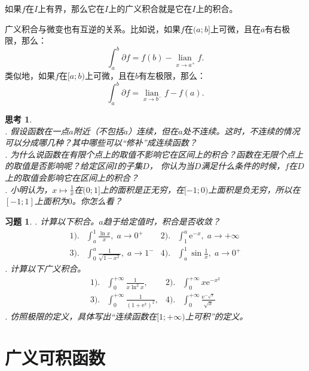 \documentclass[12pt,UTF8]{ctexbook}
\newcommand{\lian}[1]{
    \underset{#1}{\operatorname{lian}\,}
}
\newcommand{\e}{\mathrm{e}}
\theoremstyle{definition}
\theoremstyle{plain}
\newtheorem{sk}{思考}[section]
\newtheorem{xt}{习题}[section]
\begin{document}
如果$f$在$I$上有界，那么它在$I$上的广义积合就是它在$I$上的积合。

广义积合与微变也有互逆的关系。比如说，如果$f$在$(a;b]$上可微，且在$a$有右极限，那么：
$$ \int_a^b \partial f = f(b) - \lian{x\to a^+} f.$$
类似地，如果$f$在$[a;b)$上可微，且在$b$有左极限，那么：
$$ \int_a^b \partial f = \lian{x\to b^-} f - f(a).$$

\begin{sk}
    \mbox{} \\
    . 假设函数在一点$a$附近（不包括$a$）连续，但在$a$处不连续。这时，不连续的情况可以分成哪几种？其中哪些可以“修补”成连续函数？\\
    . 为什么说函数在有限个点上的取值不影响它在区间上的积合？函数在无限个点上的取值是否影响呢？给定区间$I$的子集$D$，
    你认为当$D$满足什么条件的时候，$f$在$D$上的取值会影响它在区间上的积合？\\
    . 小明认为，$x\mapsto\frac{1}{x}$在$(0;1]$上的面积是正无穷，在$[-1;0)$上面积是负无穷，所以在$[-1;1]$上面积为$0$。你怎么看？
\end{sk}

\begin{xt}
    . 计算以下积合。$a$趋于给定值时，积合是否收敛？\\    
    \begin{align*}
        1).& \int_a^{1} \frac{\ln{x}}{x} , \; a\to 0^+  &2).& \int_1^{a} \e^{-x},  \; a\to +\infty \\[3pt]
        3).& \int_0^{a} \frac{1}{\sqrt{1 - x^2}}, \; a\to 1^-   & 4).& \int_a^{1} \sin{\frac{1}{x}}, \; a\to 0^+ 
    \end{align*}
    . 计算以下广义积合。\\    
    \begin{align*}
        1).& \int_0^{+\infty} \frac{1}{x\ln^2{x}} ,  &2).& \int_0^{+\infty} x\e^{-x^2} \\[3pt]
        3).& \int_0^{+\infty} \frac{1}{(1 + \e^{x})^2},  & 4).& \int_0^{+\infty} \frac{\e^{-\sqrt{x}}}{\sqrt{x}}
    \end{align*}
    . 仿照极限的定义，具体写出“连续函数在$[1;+\infty)$上可积”的定义。\\

\end{xt}

\section{广义可积函数}
\end{document}
